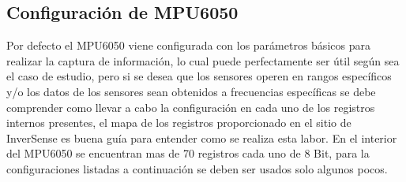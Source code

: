 \documentclass[12pt,a4paper]{article}
\begin{document}
\subsection{Configuración de MPU6050}
Por defecto el MPU6050 viene configurada con los parámetros básicos para realizar la captura de información, lo cual puede perfectamente ser útil según sea el caso de estudio, pero si se desea que los sensores operen en rangos específicos y/o los datos de los sensores sean obtenidos a frecuencias específicas se debe comprender como llevar a cabo la configuración en cada uno de los registros internos presentes, el mapa de los registros \cite{MAPREGISTER} proporcionado  en el sitio de InverSense es buena guía para entender como se realiza esta labor.
\newline En el interior del MPU6050 se encuentran mas de 70 registros cada uno de 8 Bit, para la configuraciones listadas a continuación se deben ser usados solo algunos pocos.
\end{document}
